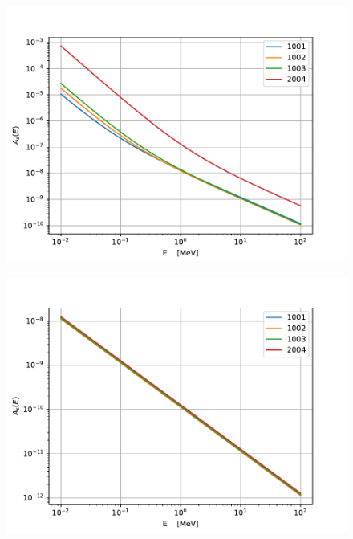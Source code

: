 \begin{figure}[!htb]
    \centering
    \begin{minipage}{.5\textwidth}
      \centering
      \includegraphics[width=\linewidth]{../figures/interaction_physics/moliere-screening.pdf}
      \label{fig:test1}
    \end{minipage}%
    \begin{minipage}{.5\textwidth}
      \centering
      \includegraphics[width=\linewidth]{../figures/interaction_physics/debye-screening.pdf}
      \label{fig:test2}
    \end{minipage}
\end{figure}